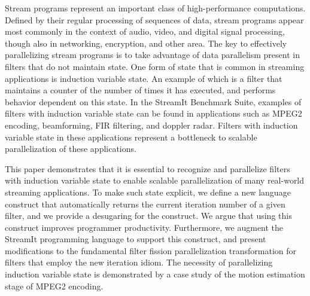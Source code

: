 Stream programs represent an important class of high-performance
computations. Deﬁned by their regular processing of sequences of data,
stream programs appear most commonly in the context of audio, video,
and digital signal processing, though also in networking, encryption,
and other area. The key to effectively parallelizing stream programs
is to take advantage of data parallelism present in filters that do
not maintain state.  One form of state that is common in streaming
applications is induction variable state.  An example of which is a
filter that maintains a counter of the number of times it has
executed, and performs behavior dependent on this state.  In the
StreamIt Benchmark Suite, examples of filters with induction variable
state can be found in applications such as MPEG2 encoding,
beamforming, FIR filtering, and doppler radar.  Filters with induction
variable state in these applications represent a bottleneck to
scalable parallelization of these applications.

This paper demonstrates that it is essential to recognize and
parallelize filters with induction variable state to enable scalable
parallelization of many real-world streaming applications.  To make
such state explicit, we define a new language construct that
automatically returns the current iteration number of a given filter,
and we provide a desugaring for the construct.  We argue that using this
construct improves programmer productivity.  Furthermore, we augment
the StreamIt programming language to support this construct, and
present modifications to the fundamental filter fission
parallelization transformation for filters that employ the new
iteration idiom.  The necessity of parallelizing induction variable
state is demonstrated by a case study of the motion estimation stage
of MPEG2 encoding.




